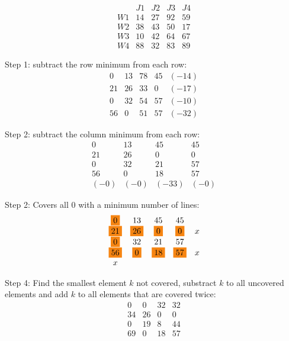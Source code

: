 \begin{appendices}
        $$\begin{matrix}
        & J1 & J2 & J3 & J4 \\
        W1 & 14 & 27 & 92 & 59 \\
        W2 & 38 & 43 & 50 & 17 \\
        W3 & 10 & 42 & 64 & 67 \\
        W4 & 88 & 32 & 83 & 89
        \end{matrix}$$

        Step 1: subtract the row minimum from each row:
        $$\begin{matrix}
        0 & 13 & 78 & 45 & (-14) \\
        21 & 26 & 33 & 0 & (-17) \\
        0 & 32 & 54 & 57 & (-10) \\
        56 & 0 & 51 & 57 & (-32)
        \end{matrix}$$

        Step 2: subtract the column minimum from each row:
        $$\begin{matrix}
        0 & 13 & 45 & 45  \\
        21 & 26 & 0 & 0   \\
        0 & 32 & 21 & 57   \\
        56 & 0 & 18 & 57   \\
        (-0) & (-0) & (-33)  & (-0)
        \end{matrix}$$

        Step 2: Covers all 0 with a minimum number of lines:
        $$\begin{matrix}
        \colorbox{BurntOrange}0 & 13 & 45 & 45 &  \\
        \colorbox{BurntOrange}{21} & \colorbox{BurntOrange}{26} & \colorbox{BurntOrange}0 & \colorbox{BurntOrange}0 & x  \\
        \colorbox{BurntOrange}0 & 32 & 21 & 57 &  \\
        \colorbox{BurntOrange}{56} & \colorbox{BurntOrange}0 & \colorbox{BurntOrange}{18} & \colorbox{BurntOrange}{57} & x  \\
        x &  &  &  &
        \end{matrix}$$

        Step 4: Find the smallest element $k$ not covered, substract $k$ to all uncovered elements and add $k$ to all elements that are covered twice:
        $$\begin{matrix}
        0 & 0 & 32 & 32  \\
        34 & 26 & 0 & 0  \\
        0 & 19 & 8 & 44  \\
        69 & 0 & 18 & 57
        \end{matrix}$$


\end{appendices}
